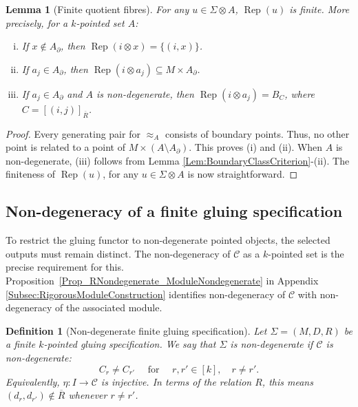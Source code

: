 \documentclass{sn-jnl}%
\theoremstyle{thmstyleone}%
\newtheorem{lemma}[theorem]{Lemma}%
\theoremstyle{thmstyletwo}%
\theoremstyle{thmstylethree}%
\newtheorem{definition}{Definition}%
\newcommand{\M}{\Sigma}
\newcommand{\F}{\M\otimes}
\begin{document}
\begin{lemma}[Finite quotient fibres]
\label{Lem:FiniteQuotientFibres}
    For any $u\in \F A$, $\operatorname{Rep}(u)$ is finite.  More precisely, for a $k$-pointed set $A$:
    \begin{enumerate}[(i)]
       \item If $x\notin A_\partial$, then
             $\operatorname{Rep}(i\otimes x)=\{(i,x)\}$.
        \item If $a_j\in   A_\partial$, then  $\operatorname{Rep}(i\otimes    a_j) \subseteq M \times A_\partial$. 
       \item If $a_j \in A_\partial$ and $A$ is non-degenerate, then $  \operatorname{Rep}(i\otimes a_j)=B_C$, where $C=[(i,j)]_{\overline R}$.
    \end{enumerate}
\end{lemma}

\begin{proof}
Every generating pair for $\approx_A$ consists of boundary points. Thus, no other point is related to a point of $M\times(A\setminus A_\partial)$. This proves (i) and (ii). When $ A$ is non-degenerate, (iii) follows from Lemma \ref{Lem:BoundaryClassCriterion}-(ii). The finiteness of $\operatorname{Rep}(u)$, for any $u \in \F A$ is now straightforward.
\end{proof}

\subsection{Non-degeneracy of a finite gluing specification}

To restrict the gluing functor to non-degenerate pointed objects, the selected outputs must remain distinct. The non-degeneracy of $\mathcal C$ as a $k$-pointed set is the precise requirement for this. Proposition~\ref{Prop_RNondegenerate_ModuleNondegenerate} in Appendix \ref{Subsec:RigorousModuleConstruction} identifies non-degeneracy of $\mathcal C$ with non-degeneracy of the associated module.

\begin{definition}[Non-degenerate finite gluing specification]
\label{Def_NondegeneracyR}
    Let $\Sigma=(M,D,R)$ be a finite $k$-pointed gluing specification.  We say that $\Sigma$ is \emph{non-degenerate} if $\mathcal C$ is non-degenerate:
    \begin{equation}
    \label{eqn:Non-degeneracy}
    \tag{ND}
        C_r \neq C_{r'} \quad \text{ for } \quad r,r' \in [k], \quad r\neq r'.
    \end{equation}
    Equivalently, $\eta:I\to\mathcal C$ is injective. In terms of the relation $R$, this means $(d_r,d_{r'})\notin \overline R$ whenever $r\ne r'$.
\end{definition}
\end{document}
